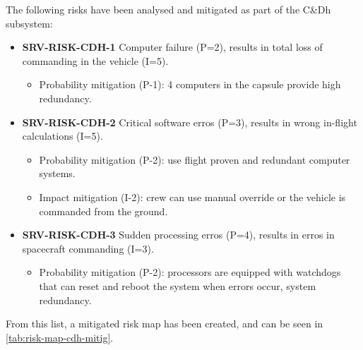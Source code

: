 \noindent The following risks have been analysed and mitigated as part of the C\&Dh subsystem:

\begin{itemize}
	 \item \textbf{SRV-RISK-CDH-1} Computer failure (P=2), results in total loss of commanding in the vehicle (I=5).
	\begin{itemize}
		 \item Probability mitigation (P-1):  4 computers in the capsule provide high redundancy.	\end{itemize}
	 \item \textbf{SRV-RISK-CDH-2} Critical software erros (P=3), results in wrong in-flight calculations (I=5).
	\begin{itemize}
		 \item Probability mitigation (P-2): use flight proven and redundant computer systems.		 \item Impact mitigation (I-2):  crew can use manual override or the vehicle is commanded from the ground.	\end{itemize}
	 \item \textbf{SRV-RISK-CDH-3} Sudden processing erros (P=4), results in erros in spacecraft commanding (I=3).
	\begin{itemize}
		 \item Probability mitigation (P-2): processors are equipped with watchdogs that can reset and reboot the system when errors occur, system redundancy.	\end{itemize}
\end{itemize}

\noindent From this list, a mitigated risk map has been created, and can be seen in \autoref{tab:risk-map-cdh-mitig}.

